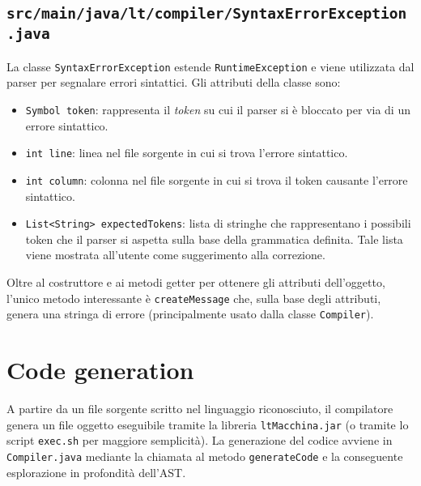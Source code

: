 \documentclass[10pt,a4paper]{article}
\begin{document}
\subsection{\texttt{src/main/java/lt/compiler/SyntaxErrorException.java}}
La classe \texttt{SyntaxErrorException} estende \texttt{RuntimeException} e viene utilizzata dal parser per segnalare errori sintattici.
Gli attributi della classe sono:
\begin{itemize}
    \item \texttt{Symbol token}: rappresenta il \textit{token} su cui il parser si è bloccato per via di un errore sintattico.
    \item \texttt{int line}: linea nel file sorgente in cui si trova l'errore sintattico.
    \item \texttt{int column}: colonna nel file sorgente in cui si trova il token causante l'errore sintattico.
    \item \texttt{List<String> expectedTokens}: lista di stringhe che rappresentano i possibili token che il parser si aspetta sulla base della grammatica definita. Tale lista viene mostrata all'utente come suggerimento alla correzione.
\end{itemize}
Oltre al costruttore e ai metodi getter per ottenere gli attributi dell'oggetto, l'unico metodo interessante è \texttt{createMessage} che, sulla base degli attributi, genera una stringa di errore (principalmente usato dalla classe \texttt{Compiler}).

\section{Code generation}

A partire da un file sorgente scritto nel linguaggio riconosciuto, il compilatore genera un file oggetto eseguibile tramite la libreria \texttt{ltMacchina.jar} (o tramite lo script \texttt{exec.sh} per maggiore semplicità).
La generazione del codice avviene in \texttt{Compiler.java} mediante la chiamata al metodo \texttt{generateCode} e la conseguente esplorazione in profondità dell'AST.
\end{document}
